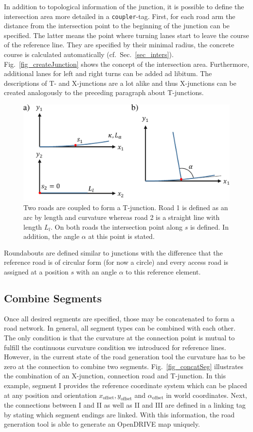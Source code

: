 \documentclass[a4paper, 10pt, conference]{ieeeconf}      %
\begin{document}
In addition to topological information of the junction, it is possible to define the intersection area more detailed in a \texttt{coupler}-tag. First, for each road arm the distance from the intersection point to the beginning of the junction can be specified. The latter means the point where turning lanes start to leave the course of the reference line. They are specified by their minimal radius, the concrete course is calculated automatically (cf.~Sec.~\ref{sec_inters}). Fig.~\ref{fig_createJunction} shows the concept of the intersection area. Furthermore, additional lanes for left and right turns can be added ad libitum. The descriptions of T- and X-junctions are a lot alike and thus X-junctions can be created analogously to the preceding paragraph about T-junctions.
\begin{figure}[tb] 		
	\centering
	\includegraphics{fig/junctionDef.pdf}	
	\caption{Two roads are coupled to form a T-junction. Road 1 is defined as an arc by length and curvature whereas road 2 is a straight line with length $L_l$. On both roads the intersection point along $s$ is defined. In addition, the angle $\alpha$ at this point is stated. }
	\label{fig_juncDef}
\end{figure}

Roundabouts are defined similar to junctions with the difference that the reference road is of circular form (for now a circle) and every access road is assigned at a position $s$ with an angle $\alpha$ to this reference element.

\subsection{Combine Segments}
Once all desired segments are specified, those may be concatenated to form a road network. In general, all segment types can be combined with each other. The only condition is that the curvature at the connection point is mutual to fulfill the continuous curvature condition we introduced for reference lines. However, in the current state of the road generation tool the curvature has to be zero at the connection to combine two segments. Fig.~\ref{fig_concatSeg} illustrates the combination of an X-junction, connection road and T-junction. In this example, segment I provides the reference coordinate system which can be placed at any position and orientation $x_\text{offset}, y_\text{offset}$ and $\alpha_\text{offset}$ in world coordinates. Next, the connections between I and II as well as II and III are defined in a linking tag by stating which segment endings are linked. With this information, the road generation tool is able to generate an OpenDRIVE map uniquely.
\end{document}
